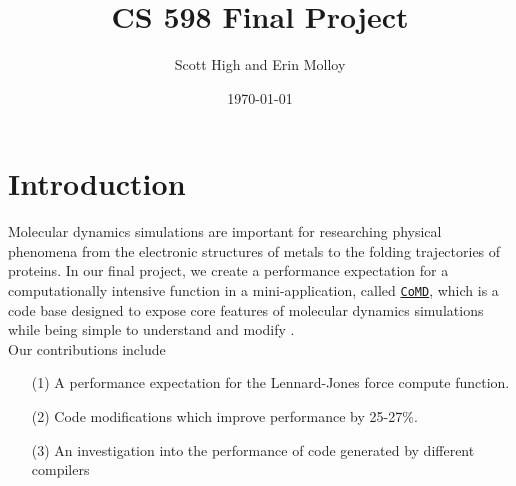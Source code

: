 \documentclass[12pt]{article}
\title{CS 598 Final Project}
\author{Scott High and Erin Molloy}
\date{\today}
\begin{document}
\maketitle

\section{Introduction}
Molecular dynamics simulations are important for researching physical phenomena 
from the electronic structures of metals to the folding trajectories of proteins. 
In our final project, we create a performance expectation for a computationally
intensive function in a mini-application, called \href{https://github.com/exmatex/CoMD}{\texttt{CoMD}}, 
which is a code base designed to expose core features of molecular dynamics simulations
while being simple to understand and modify \cite{CoMD}. \\
 Our contributions include
\begin{itemize}
    \item [(1)] A performance expectation for the Lennard-Jones force compute function.
    \item [(2)] Code modifications which improve performance by 25-27\%.
    \item [(3)] An investigation into the performance of code
      generated by different compilers
\end{itemize}
\end{document}

